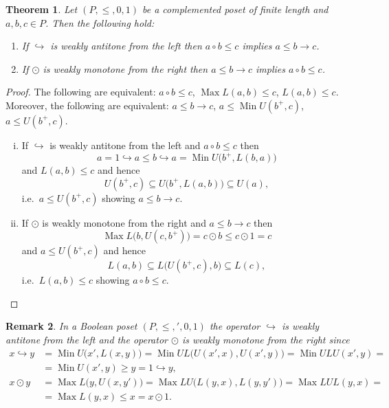 \documentclass[12pt]{article}
\DeclareMathOperator{\Max}{Max}
\DeclareMathOperator{\Min}{Min}
\newtheorem{theorem}{Theorem}[section]
\newtheorem{remark}[theorem]{Remark}
\begin{document}
\begin{theorem}\label{th1}
Let $(P,\le,0,1)$ be a complemented poset of finite length and $a,b,c\in P$. Then the following hold:
\begin{enumerate}[{\rm(i)}]
\item If $\hookrightarrow$ is weakly antitone from the left then $a\circ b\le c$ implies $a\le b\to c$.
\item If $\odot$ is weakly monotone from the right then $a\le b\to c$ implies $a\circ b\le c$.
\end{enumerate}
\end{theorem}

\begin{proof}
The following are equivalent: $a\circ b\le c$, $\Max L(a,b)\le c$, $L(a,b)\le c$. Moreover, the following are equivalent: $a\le b\to c$, $a\le\Min U(b^+,c)$, $a\le U(b^+,c)$.
\begin{enumerate}[(i)]
\item If $\hookrightarrow$ is weakly antitone from the left and $a\circ b\le c$ then
\[
a=1\hookrightarrow a\le b\hookrightarrow a=\Min U\big(b^+,L(b,a)\big)
\]
and $L(a,b)\le c$ and hence
\[
U(b^+,c)\subseteq U\big(b^+,L(a,b)\big)\subseteq U(a),
\]
i.e.\ $a\le U(b^+,c)$ showing $a\le b\to c$.
\item If $\odot$ is weakly monotone from the right and $a\le b\to c$ then
\[
\Max L\big(b,U(c,b^+)\big)=c\odot b\le c\odot1=c
\]
and $a\le U(b^+,c)$ and hence
\[
L(a,b)\subseteq L\big(U(b^+,c),b\big)\subseteq L(c),	
\]
i.e.\ $L(a,b)\le c$ showing $a\circ b\le c$.
\end{enumerate}
\end{proof}

\begin{remark}
In a Boolean poset $(P,\le,{}',0,1)$ the operator $\hookrightarrow$ is weakly antitone from the left and the operator $\odot$ is weakly monotone from the right since
\begin{align*}
x\hookrightarrow y & =\Min U\big(x',L(x,y)\big)=\Min UL\big(U(x',x),U(x',y)\big)=\Min ULU(x',y)= \\
                   & =\Min U(x',y)\ge y=1\hookrightarrow y, \\
          x\odot y & =\Max L\big(y,U(x,y')\big)=\Max LU\big(L(y,x),L(y,y')\big)=\Max LUL(y,x)= \\
                   & =\Max L(y,x)\le x=x\odot1.	
\end{align*}
\end{remark}
\end{document}

